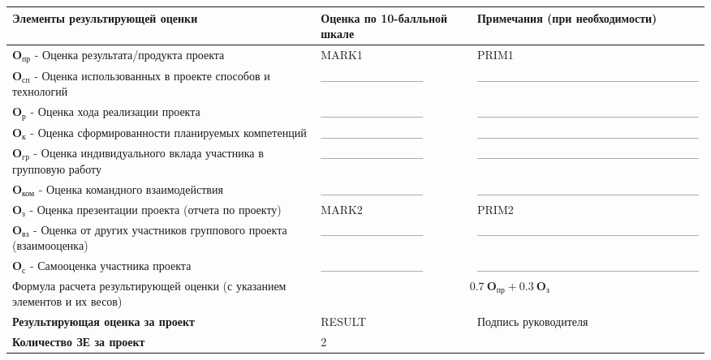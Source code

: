 \documentclass[10pt]{article}
\begin{document}
\vspace{-0.95cm}
\begin{table*}[h!]
	\centering
	\begin{tabular}{|m{}<{\centering}|m{}<{\centering}|m{}<{\centering}|}
	\noalign{\smallskip}
	\hline
	Элементы результирующей оценки\footnotemark  & Оценка по 10-балльной шкале & Примечания (при необходимости) \\
	\hline 
	{\bf $\mathbf{O_{\text{пр}}}$ } - Оценка результата/продукта проекта & MARK1 & PRIM1 \\
	\hline 
	{\bf $\mathbf{O_{\text{сп}}}$ } - Оценка использованных в проекте способов и технологий & \_\_\_\_\_\_\_\_\_\_\_\_ & \_\_\_\_\_\_\_\_\_\_\_\_\_\_\_\_\_\_\_\_\_\_\_\_\_\_\\
	\hline 
	{\bf $\mathbf{O_{\text{р}}}$ } - Оценка хода реализации проекта & \_\_\_\_\_\_\_\_\_\_\_\_ & \_\_\_\_\_\_\_\_\_\_\_\_\_\_\_\_\_\_\_\_\_\_\_\_\_\_\\
	\hline 
	{\bf $\mathbf{O_{\text{к}}}$ } - Оценка сформированности планируемых компетенций & \_\_\_\_\_\_\_\_\_\_\_\_ & \_\_\_\_\_\_\_\_\_\_\_\_\_\_\_\_\_\_\_\_\_\_\_\_\_\_\\
	\hline 
	{\bf $\mathbf{O_{\text{гр}}}$ } - Оценка индивидуального вклада участника в групповую работу & \_\_\_\_\_\_\_\_\_\_\_\_ & \_\_\_\_\_\_\_\_\_\_\_\_\_\_\_\_\_\_\_\_\_\_\_\_\_\_\\
	\hline 
	{\bf $\mathbf{O_{\text{ком}}}$ } - Оценка командного взаимодействия & \_\_\_\_\_\_\_\_\_\_\_\_ & \_\_\_\_\_\_\_\_\_\_\_\_\_\_\_\_\_\_\_\_\_\_\_\_\_\_\\
	\hline 
	{\bf $\mathbf{O_{\text{з}}}$ } - Оценка презентации проекта (отчета по проекту) & MARK2 & PRIM2 \\
	\hline 
	{\bf $\mathbf{O_{\text{вз}}}$ } - Оценка от других участников группового проекта (взаимооценка) & \_\_\_\_\_\_\_\_\_\_\_\_ & \_\_\_\_\_\_\_\_\_\_\_\_\_\_\_\_\_\_\_\_\_\_\_\_\_\_\\
	\hline  
	{\bf $\mathbf{O_{\text{с}}}$ } - Самооценка участника проекта & \_\_\_\_\_\_\_\_\_\_\_\_ & \_\_\_\_\_\_\_\_\_\_\_\_\_\_\_\_\_\_\_\_\_\_\_\_\_\_\\
	\hline
	
	Формула расчета результирующей оценки (с указанием элементов и их весов)  & \multicolumn{2}{c|}{$0.7~\mathbf{O_{\text{пр}}} + 0.3~\mathbf{O_{\text{з}}}$} \\
	
	\hline
	{\bf Результирующая оценка за проект} & RESULT & \multirow{2}{*}{Подпись руководителя}\\
	\cline{1-2}
	{\bf Количество ЗЕ за проект} & 2 & 
	\\
	
	\hline
	
	
	\end{tabular}
\end{table*}
\end{document}
